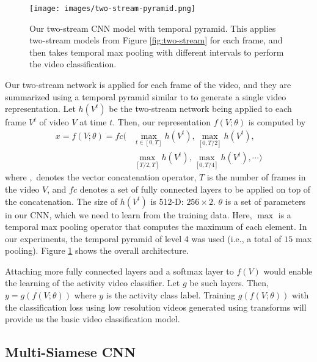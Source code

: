 \documentclass[letterpaper]{article} %
\begin{document}
\begin{figure}
\begin{center}
   \texttt{[image: images/two-stream-pyramid.png]}
\end{center}
   \caption{Our two-stream CNN model with temporal pyramid. This applies two-stream models from Figure \ref{fig:two-stream} for each frame, and then takes temporal max pooling with different intervals to perform the video classification.}
\label{fig:two-stream-pyramid}		
\end{figure}

Our two-stream network is applied for each frame of the video, and they are summarized using a temporal pyramid similar to \cite{ryoo15} to generate a single video representation. Let $h(V^t)$ be the two-stream network being applied to each frame $V^t$ of video $V$ at time $t$. Then, our representation $f(V ; \theta)$ is computed by 
\begin{equation}
\begin{split}
x = f(V ; \theta) = fc(&\max_{t \in [0,T]} h(V^t), \max_{[0,T/2]} h(V^t),\\
                    &\max_{[T/2,T]} h(V^t), \max_{[0,T/4]} h(V^t), \cdots)
\end{split}
\end{equation}
where $,$ denotes the vector concatenation operator, $T$ is the number of frames in the video $V$, and $fc$ denotes a set of fully connected layers to be applied on top of the concatenation. The size of $h(V^t)$ is 512-D: $256 \times 2$. $\theta$ is a set of parameters in our CNN, which we need to learn from the training data. Here, $\max$ is a temporal max pooling operator that computes the maximum of each element. In our experiments, the temporal pyramid of level 4 was used (i.e., a total of $15$ max pooling). Figure \ref{fig:two-stream-pyramid} shows the overall architecture.

Attaching more fully connected layers and a softmax layer to $f(V)$ would enable the learning of the activity video classifier. Let $g$ be such layers. Then, $y = g(f(V ; \theta))$ where $y$ is the activity class label. Training $g(f(V ; \theta))$ with the classification loss using low resolution videos generated using transforms will provide us the basic video classification model.


\subsection{Multi-Siamese CNN}
\label{subsec:multi-siamese}
\end{document}
